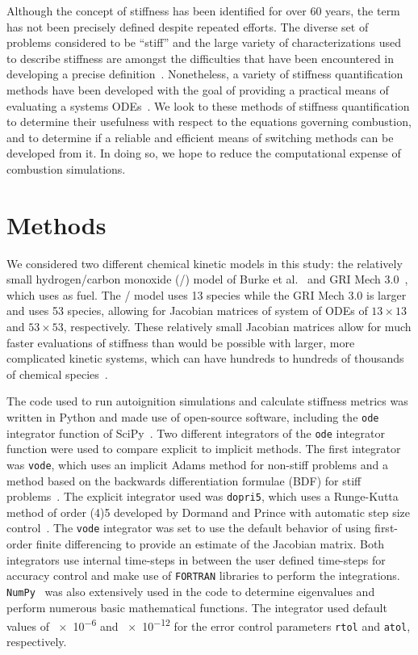 \documentclass[12pt]{ussci}
\begin{document}
Although the concept of stiffness has been identified for over 60 years, the term has not been precisely defined despite repeated efforts.
The diverse set of problems considered to be ``stiff'' and the large variety of characterizations used to describe stiffness are amongst the difficulties that have been encountered in developing a precise definition~\cite{Soderlind2014}.
Nonetheless, a variety of stiffness quantification methods have been developed with the goal of providing a practical means of evaluating a systems ODEs~\cite{Soderlind2014,Shampine1985,Brugnano2011,Lambert1973ComputationalEquations,Hairer1996SolvingII}.
We look to these methods of stiffness quantification to determine their usefulness with respect to the equations governing combustion, and to determine if a reliable and efficient means of switching methods can be developed from it.
In doing so, we hope to reduce the computational expense of combustion simulations.

\section{Methods}
We considered two different chemical kinetic models in this study: the relatively small hydrogen\slash carbon monoxide (\slash {}) model of Burke et al.~\cite{Burke:2011fh} and GRI Mech 3.0~\cite{grimech3}, which uses  as fuel.
The \slash {} model uses 13 species while the GRI Mech 3.0 is larger and uses 53 species, allowing for Jacobian matrices of system of ODEs of $13 \times 13$ and $53 \times 53$, respectively.
These relatively small Jacobian matrices allow for much faster evaluations of stiffness than would be possible with larger, more complicated kinetic systems, which can have hundreds to hundreds of thousands of chemical species~\cite{Niemeyer:2013}.

The code used to run autoignition simulations and calculate stiffness metrics was written in Python and made use of open-source software, including the \texttt{ode} integrator function of SciPy~\cite{SciPy}.
Two different integrators of the \texttt{ode} integrator function were used to compare explicit to implicit methods. 
The first integrator was \texttt{vode}, which uses an implicit Adams method for non-stiff problems and a method based on the backwards differentiation formulae (BDF) for stiff problems~\cite{Brown1989}.
The explicit integrator used was \texttt{dopri5}, which uses a Runge-Kutta method of order (4)5 developed by Dormand and Prince with automatic step size control~\cite{E.HairerSPNorsett1990}.
The \texttt{vode} integrator was set to use the default behavior of using first-order finite differencing to provide an estimate of the Jacobian matrix.
Both integrators use internal time-steps in between the user defined time-steps for accuracy control and make use of \texttt{FORTRAN} libraries to perform the integrations.
\texttt{NumPy}~\cite{VanDerWalt2011} was also extensively used in the code to determine eigenvalues and perform numerous basic mathematical functions.
The integrator used default values of \num{e-6} and \num{e-12} for the error control parameters \texttt{rtol} and \texttt{atol}, respectively.
\end{document}
